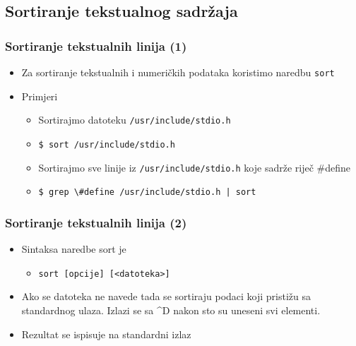 \documentclass{beamer}
\newcommand{\shell}[1]{\texttt{#1}}
\begin{document}
\subsection{Sortiranje tekstualnog sadržaja}
\begin{frame}[t]
\frametitle{Sortiranje tekstualnih linija (1)}
\begin{itemize}
  \item Za sortiranje tekstualnih i numeričkih podataka koristimo naredbu 
        \shell{sort}
  \item Primjeri
  \begin{itemize}
    \item Sortirajmo datoteku \shell{/usr/include/stdio.h}
    \item[] \shell{\$ sort /usr/include/stdio.h}
    \item Sortirajmo sve linije iz \shell{/usr/include/stdio.h} koje sadrže
          riječ \#define
    \item[] \shell{\$ grep \textbackslash{}\#define /usr/include/stdio.h | 
                   sort}
  \end{itemize}
\end{itemize}
\end{frame}

\begin{frame}[t]
\frametitle{Sortiranje tekstualnih linija (2)}
\begin{itemize}
  \item Sintaksa naredbe sort je
  \begin{itemize}
    \item[] \shell{sort [opcije] [<datoteka>]}
  \end{itemize}
  \item Ako se datoteka ne navede tada se sortiraju podaci koji pristižu sa
        standardnog ulaza. Izlazi se sa  \^{}D  nakon sto su uneseni svi elementi.
  \item Rezultat se ispisuje na standardni izlaz
\end{itemize}
\end{frame}
\end{document}
